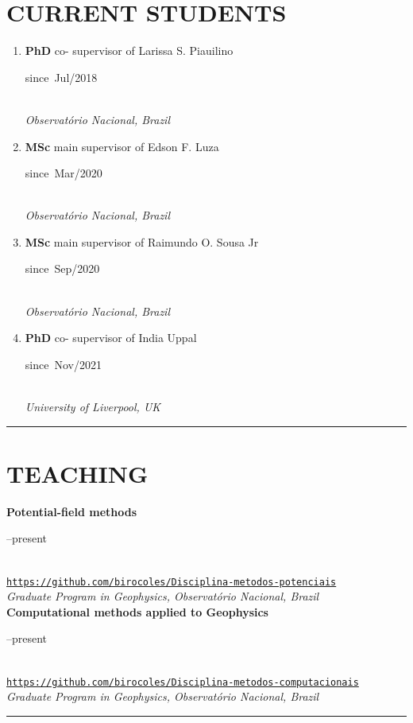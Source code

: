 \documentclass[11pt,a4paper,onecolumn]{article}
\newcommand{\Student}[5]{
	\noindent \textbf{#1} #2 supervisor of #3 \hfill 
	\parbox{0.1\textwidth}{\raggedleft since~#4} \\
	\noindent\textsl{#5}}
\begin{document}
\section*{CURRENT STUDENTS}

\begin{enumerate}[leftmargin=*, label=\textbf{(\arabic*)}]

	\item\Student{PhD}{co-}{Larissa S. Piauilino}{Jul/2018}{Observat{\'o}rio Nacional, Brazil}

	\item\Student{MSc}{main}{Edson F. Luza}{Mar/2020}{Observat{\'o}rio Nacional, Brazil}	
	
	\item\Student{MSc}{main}{Raimundo O. Sousa Jr}{Sep/2020}{Observat{\'o}rio Nacional, Brazil}
	
	\item\Student{PhD}{co-}{India Uppal}{Nov/2021}{University of Liverpool, UK}

	
\end{enumerate}

\bigskip \hrule

\section*{TEACHING}{}

\noindent \textbf{Potential-field methods} \hfill 
\parbox{0.1\textwidth}{--present} \\
\noindent\href{https://github.com/birocoles/Disciplina-metodos-potenciais}
{\texttt{https://github.com/birocoles/Disciplina-metodos-potenciais}} \\
\noindent\textsl{Graduate Program in Geophysics, Observat\'{o}rio Nacional, Brazil} \vspace{0.5\baselineskip} \\
\noindent \textbf{Computational methods applied to Geophysics} \hfill
\parbox{0.1\textwidth}{--present} \\
\noindent\href{https://github.com/birocoles/Disciplina-metodos-computacionais}
{\texttt{https://github.com/birocoles/Disciplina-metodos-computacionais}} \\
\noindent\textsl{Graduate Program in Geophysics, Observat\'{o}rio Nacional, Brazil} \\

\bigskip \hrule
\end{document}
